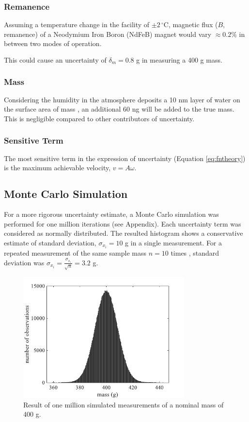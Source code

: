 \documentclass[12pt]{article}
\begin{document}
\subsubsection{Remanence}
Assuming a temperature change in the facility of $\pm2\,^\circ\textrm{C}$, magnetic flux ($B$, remanence) of a Neodymium Iron Boron (NdFeB) magnet would vary $\approx0.2 \%$ \cite{ndmagnets} in between two modes of operation.

This could cause an uncertainty of $\delta_m=0.8$ g in measuring a 400 g mass.
\subsubsection{Mass}
Considering the humidity in the atmosphere deposits a 10 nm layer of water on the surface area of mass \cite{harmsen2010}, an additional 60 ng will be added to the true mass. This is negligible compared to other contributors of uncertainty. 
\subsubsection{Sensitive Term}
The most sensitive term in the expression of uncertainty (Equation \ref{eq:fntheory}) is the maximum achievable velocity, $v=A\omega$.

\subsection{Monte Carlo Simulation}
For a more rigorous uncertainty estimate, a Monte Carlo simulation was performed for one million iterations (see Appendix). Each uncertainty term was considered as normally distributed. The resulted histogram shows a conservative estimate of standard deviation, $\sigma_{x_i}=10$ g in a single measurement. For a repeated measurement of the same sample mass $n=10$ times , standard deviation was $\sigma_{x_i}=\frac{\sigma_{x_i}}{\sqrt{n}}=3.2$ g. 

\begin{figure}[ht!]
	\centering
	\includegraphics[height = 2.6in]{histogram}
	\caption{Result of one million simulated measurements of a nominal mass of 400 g.}
	\label{fig:histogram}
\end{figure}
\end{document}
